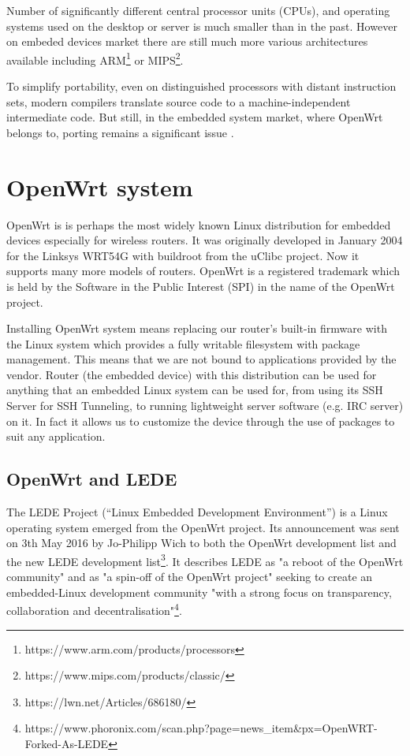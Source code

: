 Number of significantly different central processor units (CPUs), and operating systems used on the desktop or server is much smaller than in the past.
However on embeded devices market there are still much more various architectures available including ARM\footnote{https://www.arm.com/products/processors} or MIPS\footnote{https://www.mips.com/products/classic/}.

To simplify portability, even on distinguished processors with distant instruction sets, modern compilers translate source code to a machine-independent intermediate code.
But still, in the embedded system market, where OpenWrt belongs to, porting remains a significant issue \cite{porting_software}.

\section{OpenWrt system}\label{owrt}
OpenWrt is is perhaps the most widely known Linux distribution for embedded devices especially for wireless routers.
It was originally developed in January 2004 for the Linksys WRT54G with buildroot from the uClibc project.
Now it supports many more models of routers.
OpenWrt is a registered trademark which is held by the Software in the Public Interest (SPI) in the name of the OpenWrt project.

Installing OpenWrt system means replacing our router’s built-in firmware with the Linux system which provides a fully writable filesystem with package management.
This means that we are not bound to applications provided by the vendor.
Router (the embedded device) with this distribution can be used for anything that an embedded Linux system can be used for, from using its SSH Server for SSH Tunneling, to running lightweight server software (e.g. IRC server) on it.
In fact it allows us to customize the device through the use of packages to suit any application. \cite{openwrt}

\subsection{OpenWrt and LEDE}

The LEDE Project (“Linux Embedded Development Environment”) is a Linux operating system emerged from the OpenWrt project.
Its announcement was sent on 3th May 2016 by Jo-Philipp Wich to both the OpenWrt development list and the new LEDE development list\footnote{https://lwn.net/Articles/686180/}.
It describes LEDE as "a reboot of the OpenWrt community" and as "a spin-off of the OpenWrt project" seeking to create an embedded-Linux development community "with a strong focus on transparency, collaboration and decentralisation"\footnote{https://www.phoronix.com/scan.php?page=news\_item\&px=OpenWRT-Forked-As-LEDE}.

